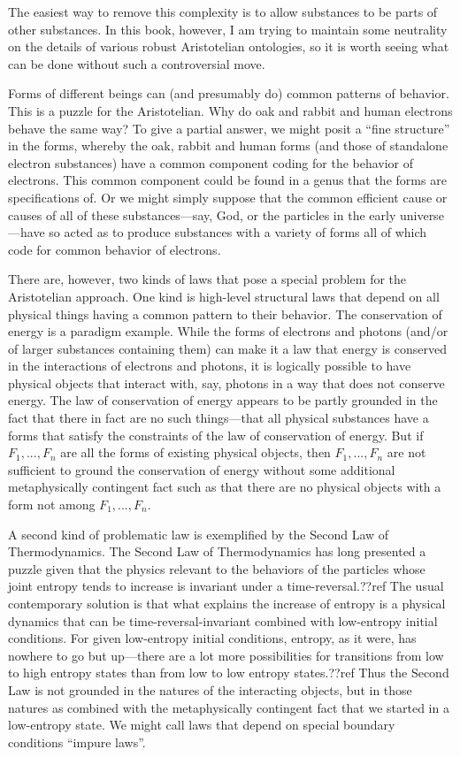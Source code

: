 The easiest way to remove this complexity is to allow substances to be parts of other substances. In this book, however, 
I am trying to maintain some neutrality on the details of various robust Aristotelian ontologies, so it is worth seeing
what can be done without such a controversial move.

Forms of different beings can (and presumably do) common patterns of behavior.  This is a puzzle for the Aristotelian. 
Why do oak and rabbit and human
electrons behave the same way? To give a partial answer, we might posit a ``fine structure'' in the forms, whereby the oak, 
rabbit and human forms (and those of standalone electron substances) have a common component coding for the behavior of 
electrons. This common component could be found in a genus that the forms are specifications of. Or we might simply suppose
that the common efficient cause or causes of all of these substances---say, God, or the particles in the early universe---have
so acted as to produce substances with a variety of forms all of which code for common behavior of electrons. 

There are, however, two kinds of laws that pose a special problem for the Aristotelian approach. One kind is high-level
structural laws that depend on all physical things having a common pattern to their behavior. The conservation of energy
is a paradigm example. While the forms of electrons and photons (and/or of larger substances containing them) can make 
it a law that energy is conserved in the interactions of electrons and photons, it is logically possible to have 
physical objects that interact with, say, photons in a way that does not conserve energy. The law of conservation of 
energy appears to be partly grounded in the fact that there in fact are no such things---that all physical substances have a 
forms that satisfy the constraints of the law of conservation of energy. But if $F_1,...,F_n$ are all the forms
of existing physical objects, then $F_1,...,F_n$ are not sufficient to ground the conservation of energy without some
additional metaphysically contingent fact such as that there are no physical objects with a form not among $F_1,...,F_n$. 

A second kind of problematic law is exemplified by the Second Law of Thermodynamics. The Second Law of Thermodynamics
has long presented a puzzle given that the physics relevant to the behaviors of the particles whose joint entropy tends to increase
is invariant under a time-reversal.??ref The usual contemporary solution is that what explains the increase of entropy is a physical dynamics
that can be time-reversal-invariant combined with low-entropy initial conditions. For given low-entropy initial conditions,
entropy, as it were, has nowhere to go but up---there are a lot more possibilities for transitions from low to high entropy states
than from low to low entropy states.??ref Thus the Second Law is not grounded in the natures of the interacting objects, 
but in those natures as combined with the metaphysically contingent fact that we started in a low-entropy state.  We might 
call laws that depend on special boundary conditions ``impure laws''. 

